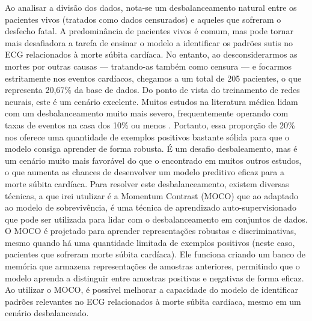 Ao analisar a divisão dos dados, nota-se um desbalanceamento natural entre os pacientes vivos (tratados como dados censurados) e aqueles que sofreram o desfecho fatal. A predominância de pacientes vivos é comum, mas pode tornar mais desafiadora a tarefa de ensinar o modelo a identificar os padrões sutis no ECG relacionados à morte súbita cardíaca. No entanto, ao desconsiderarmos as mortes por outras causas — tratando-as também como censura — e focarmos estritamente nos eventos cardíacos, chegamos a um total de 205 pacientes, o que representa 20,67\% da base de dados. Do ponto de vista do treinamento de redes neurais, este é um cenário excelente. Muitos estudos na literatura médica lidam com um desbalanceamento muito mais severo, frequentemente operando com taxas de eventos na casa dos 10\% ou menos \cite{physionet2020cardiovascular}. Portanto, essa proporção de 20\% nos oferece uma quantidade de exemplos positivos bastante sólida para que o modelo consiga aprender de forma robusta. É um desafio desbaleamento, mas é um cenário muito mais favorável do que o encontrado em muitos outros estudos, o que aumenta as chances de desenvolver um modelo preditivo eficaz para a morte súbita cardíaca. Para resolver este desbalanceamento, existem diversas técnicas, a que irei utulizar é a Momentum Contrast (MOCO) \cite{he2020momentum} que ao adaptado ao modelo de sobrevivência, é uma técnica de aprendizado auto-supervisionado que pode ser utilizada para lidar com o desbalanceamento em conjuntos de dados. O MOCO é projetado para aprender representações robustas e discriminativas, mesmo quando há uma quantidade limitada de exemplos positivos (neste caso, pacientes que sofreram morte súbita cardíaca). Ele funciona criando um banco de memória que armazena representações de amostras anteriores, permitindo que o modelo aprenda a distinguir entre amostras positivas e negativas de forma eficaz. Ao utilizar o MOCO, é possível melhorar a capacidade do modelo de identificar padrões relevantes no ECG relacionados à morte súbita cardíaca, mesmo em um cenário desbalanceado.

